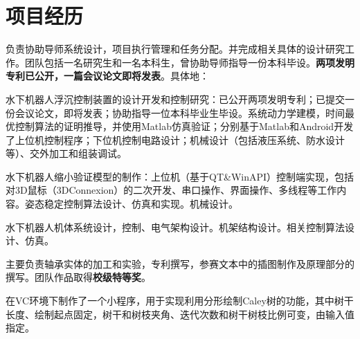 \documentclass[letterpaper]{deedy-resume} %
\begin{document}
\begin{minipage}[t]{0.65\textwidth}

\section{项目经历}


负责协助导师系统设计，项目执行管理和任务分配。并完成相关具体的设计研究工作。团队包括一名研究生和一名本科生，曾协助导师指导一份本科毕设。\textbf{两项发明专利已公开，一篇会议论文即将发表}。具体地：\\
\vspace{\topsep}
\begin{tightitemize}
\item 水下机器人浮沉控制装置的设计开发和控制研究：已公开两项发明专利；已提交一份会议论文，即将发表；协助指导一位本科毕业生毕设。系统动力学建模，时间最优控制算法的证明推导，并使用Matlab仿真验证；分别基于Matlab和Android开发了上位机控制程序；下位机控制电路设计；机械设计（包括液压系统、防水设计等）、交外加工和组装调试。
\item 水下机器人缩小验证模型的制作：上位机（基于QT\&WinAPI）控制端实现，包括对3D鼠标（3DConnexion）的二次开发、串口操作、界面操作、多线程等工作内容。姿态稳定控制算法设计、仿真和实现。机械设计。
\item 水下机器人机体系统设计，控制、电气架构设计。机架结构设计。相关控制算法设计、仿真。
\end{tightitemize}
\sectionspace %



主要负责轴承实体的加工和实验，专利撰写，参赛文本中的插图制作及原理部分的撰写。团队作品取得\textbf{校级特等奖}。

\sectionspace %



在VC环境下制作了一个小程序，用于实现利用分形绘制Caley树的功能，其中树干长度、绘制起点固定，树干和树枝夹角、迭代次数和树干树枝比例可变，由输入值指定。


\end{minipage}
\end{document}
